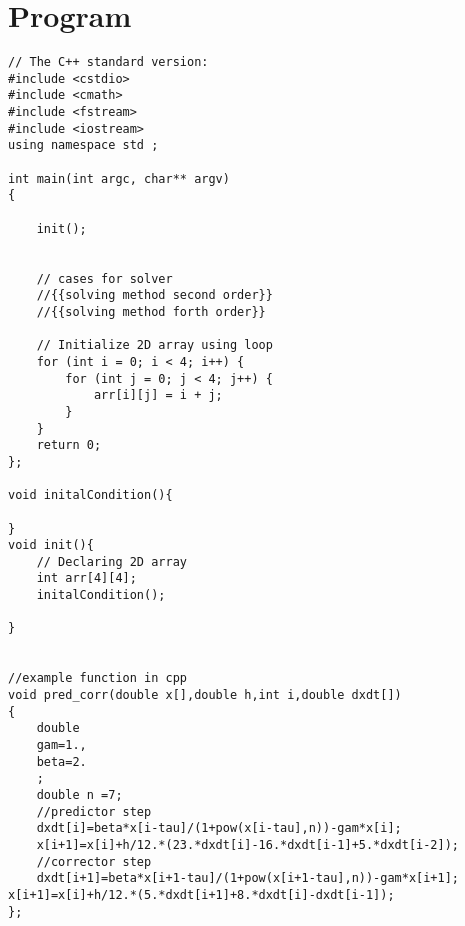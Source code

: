 \documentclass[10pt,fleqn,reqno,a4paper]{article}
\begin{document}
\section{Program}
\begin{verbatim}
// The C++ standard version:
#include <cstdio>
#include <cmath>
#include <fstream>
#include <iostream>
using namespace std ;

int main(int argc, char** argv)
{

    init();


    // cases for solver
    //{{solving method second order}}
    //{{solving method forth order}}

	// Initialize 2D array using loop
	for (int i = 0; i < 4; i++) {
		for (int j = 0; j < 4; j++) {
			arr[i][j] = i + j;
		}
	}
	return 0;
};

void initalCondition(){

}
void init(){
    // Declaring 2D array
	int arr[4][4];
    initalCondition();

}


//example function in cpp
void pred_corr(double x[],double h,int i,double dxdt[])
{
	double
	gam=1.,
	beta=2.
	;
	double n =7;
	//predictor step
	dxdt[i]=beta*x[i-tau]/(1+pow(x[i-tau],n))-gam*x[i];
	x[i+1]=x[i]+h/12.*(23.*dxdt[i]-16.*dxdt[i-1]+5.*dxdt[i-2]);
	//corrector step
	dxdt[i+1]=beta*x[i+1-tau]/(1+pow(x[i+1-tau],n))-gam*x[i+1]; x[i+1]=x[i]+h/12.*(5.*dxdt[i+1]+8.*dxdt[i]-dxdt[i-1]);
};
\end{verbatim}
\end{document}
